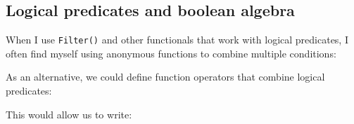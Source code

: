 \hypertarget{logical-predicates-and-boolean-algebra}{%
\subsection{Logical predicates and boolean
algebra}\label{logical-predicates-and-boolean-algebra}}

When I use \texttt{Filter()} and other functionals that work with
logical predicates, I often find myself using anonymous functions to
combine multiple conditions: 

\begin{Shaded}
\begin{Highlighting}[]
\NormalTok{(}\OperatorTok{||}\StringTok{ }
\end{Highlighting}
\end{Shaded}

As an alternative, we could define function operators that combine
logical predicates:

\begin{Shaded}
\begin{Highlighting}[]
\StringTok{ }
    \OperatorTok{&&}\StringTok{ }
\NormalTok{  \}}
\NormalTok{\}}

\StringTok{ }
    \OperatorTok{||}\StringTok{ }
\NormalTok{  \}}
\NormalTok{\}}

\StringTok{ }
    \OperatorTok{!}
\NormalTok{  \}}
\NormalTok{\}}
\end{Highlighting}
\end{Shaded}

This would allow us to write:

\begin{Shaded}
\begin{Highlighting}[]
\NormalTok{(}
\NormalTok{(}
\end{Highlighting}
\end{Shaded}

